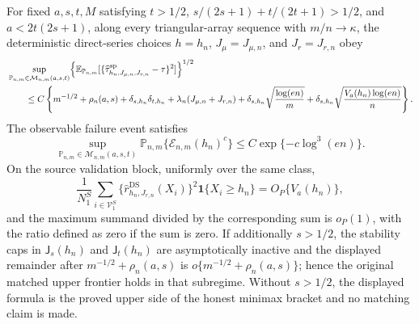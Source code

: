For fixed \(a,s,t,M\) satisfying \(t>1/2\), \(s/(2s+1)+t/(2t+1)>1/2\), and \(a<2t(2s+1)\), along every triangular-array sequence with \(m/n\to\kappa\), the deterministic direct-series choices \(h=h_n\), \(J_\mu=J_{\mu,n}\), and \(J_r=J_{r,n}\) obey
\[
\begin{aligned}
&\sup_{\mathbb P_{n,m}\in\mathcal M_{n,m}(a,s,t)}
 \Bigl\{\mathbb E_{\mathbb P_{n,m}}
 [\{\widehat\tau^{\mathrm{sp}}_{h_n,J_{\mu,n},J_{r,n}}-\tau\}^2]\Bigr\}^{1/2}\\
&\qquad\le C\left\{m^{-1/2}+\rho_n(a,s)
 +\delta_{s,h_n}\delta_{t,h_n}
 +\lambda_n(J_{\mu,n}+J_{r,n})
 +\delta_{s,h_n}\sqrt{\frac{\log(en)}m}
 +\delta_{s,h_n}\sqrt{\frac{V_a(h_n)\log(en)}n}\right\}.
\end{aligned}
\]
The observable failure event satisfies
\[
 \sup_{\mathbb P_{n,m}\in\mathcal M_{n,m}(a,s,t)}
 \mathbb P_{n,m}\{\mathcal E_{n,m}(h_n)^c\}
 \le C\exp\{-c\log^3(en)\}.
\]
On the source validation block, uniformly over the same class,
\[
 \frac1{N^S_1}\sum_{i\in\mathcal V^S_1}
 \{\widehat r^{\mathrm{DS}}_{h_n,J_{r,n}}(X_i)\}^2
 \mathbf 1\{X_i\ge h_n\}=O_P\{V_a(h_n)\},
\]
and the maximum summand divided by the corresponding sum is \(o_P(1)\), with the ratio defined as zero if the sum is zero.  If additionally \(s>1/2\), the stability caps in \(\mathsf J_s(h_n)\) and \(\mathsf J_t(h_n)\) are asymptotically inactive and the displayed remainder after \(m^{-1/2}+\rho_n(a,s)\) is \(o\{m^{-1/2}+\rho_n(a,s)\}\); hence the original matched upper frontier holds in that subregime.  Without \(s>1/2\), the displayed formula is the proved upper side of the honest minimax bracket and no matching claim is made.